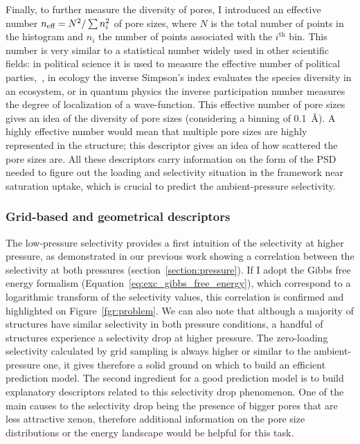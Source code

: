 \documentclass[main]{subfiles}
\begin{document}
Finally, to further measure the diversity of pores, I introduced an effective number $n_{\text{eff}} = N^2/\sum n_i^2$ of pore sizes, where $N$ is the total number of points in the histogram and $n_i$ the number of points associated with the $i^\text{th}$ bin. This number is very similar to a statistical number widely used in other scientific fields: in political science it is used to measure the effective number of political parties,~\autocite{neffposci_Laakso1979}, in ecology the inverse Simpson's index evaluates the species diversity in an ecosystem,\autocite{neffbio_Simpson1949} or in quantum physics the inverse participation number measures the degree of localization of a wave-function.\autocite{neffphys_Kramer1993} This effective number of pore sizes gives an idea of the diversity of pore sizes (considering a binning of \SI{0.1}{\angstrom}). A highly effective number would mean that multiple pore sizes are highly represented in the structure; this descriptor gives an idea of how scattered the pore sizes are.
All these descriptors carry information on the form of the PSD needed to figure out the loading and selectivity situation in the framework near saturation uptake, which is crucial to predict the ambient-pressure selectivity.

\subsubsection{Grid-based and geometrical descriptors}

The low-pressure selectivity provides a first intuition of the selectivity at higher pressure, as demonstrated in our previous work showing a correlation between the selectivity at both pressures (section~\ref{section:pressure}). If I adopt the Gibbs free energy formalism (Equation~\ref{eq:exc_gibbs_free_energy}), which correspond to a logarithmic transform of the selectivity values, this correlation is confirmed and highlighted on Figure~\ref{fgr:problem}. We can also note that although a majority of structures have similar selectivity in both pressure conditions, a handful of structures experience a selectivity drop at higher pressure. The zero-loading selectivity calculated by grid sampling is always higher or similar to the ambient-pressure one, it gives therefore a solid ground on which to build an efficient prediction model. The second ingredient for a good prediction model is to build explanatory descriptors related to this selectivity drop phenomenon. One of the main causes to the selectivity drop being the presence of bigger pores that are less attractive xenon, therefore additional information on the pore size distributions or the energy landscape would be helpful for this task.
\end{document}
